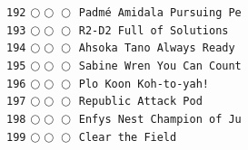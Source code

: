 \documentclass[a4paper,landscape]{article}
\begin{document}
\begin{multicols*}{5}
\texttt{192} \(\bigcirc\!\bigcirc\!\bigcirc\)  \texttt{Padmé Amidala Pursuing Pe} \vspace{-0.3mm}\\ 
\texttt{193} \(\bigcirc\!\bigcirc\!\bigcirc\)  \texttt{R2-D2 Full of Solutions} \vspace{-0.3mm}\\ 
\texttt{194} \(\bigcirc\!\bigcirc\!\bigcirc\)  \texttt{Ahsoka Tano Always Ready } \vspace{-0.3mm}\\ 
\texttt{195} \(\bigcirc\!\bigcirc\!\bigcirc\)  \texttt{Sabine Wren You Can Count} \vspace{-0.3mm}\\ 
\texttt{196} \(\bigcirc\!\bigcirc\!\bigcirc\)  \texttt{Plo Koon Koh-to-yah!} \vspace{-0.3mm}\\ 
\texttt{197} \(\bigcirc\!\bigcirc\!\bigcirc\)  \texttt{Republic Attack Pod} \vspace{-0.3mm}\\ 
\texttt{198} \(\bigcirc\!\bigcirc\!\bigcirc\)  \texttt{Enfys Nest Champion of Ju} \vspace{-0.3mm}\\ 
\texttt{199} \(\bigcirc\!\bigcirc\!\bigcirc\)  \texttt{Clear the Field} \vspace{-0.3mm}\\ 

\end{multicols*}
\end{document}
